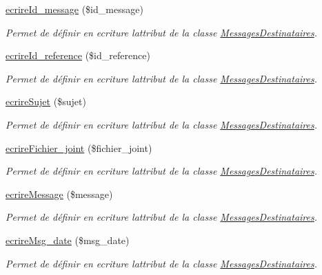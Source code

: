 \begin{DoxyCompactItemize}
\hyperlink{class_messages_destinataires_aea5aed1c8ce67a439ae35c2bfa62e6d0}{ecrire\+Id\+\_\+message} (\$id\+\_\+message)
\begin{DoxyCompactList}\small\item\em Permet de définir en ecriture l\textquotesingle{}attribut de la classe \hyperlink{class_messages_destinataires}{Messages\+Destinataires}. \end{DoxyCompactList}\item 
\hyperlink{class_messages_destinataires_a558514a13d24d12529fb44cb69570ebd}{ecrire\+Id\+\_\+reference} (\$id\+\_\+reference)
\begin{DoxyCompactList}\small\item\em Permet de définir en ecriture l\textquotesingle{}attribut de la classe \hyperlink{class_messages_destinataires}{Messages\+Destinataires}. \end{DoxyCompactList}\item 
\hyperlink{class_messages_destinataires_afc9baab378711b5c2f2ee1a55b65b2bb}{ecrire\+Sujet} (\$sujet)
\begin{DoxyCompactList}\small\item\em Permet de définir en ecriture l\textquotesingle{}attribut de la classe \hyperlink{class_messages_destinataires}{Messages\+Destinataires}. \end{DoxyCompactList}\item 
\hyperlink{class_messages_destinataires_a1631d4919b99b1ee745a0327efa30d56}{ecrire\+Fichier\+\_\+joint} (\$fichier\+\_\+joint)
\begin{DoxyCompactList}\small\item\em Permet de définir en ecriture l\textquotesingle{}attribut de la classe \hyperlink{class_messages_destinataires}{Messages\+Destinataires}. \end{DoxyCompactList}\item 
\hyperlink{class_messages_destinataires_a65fa214bdfd7209f433c932e649aedb6}{ecrire\+Message} (\$message)
\begin{DoxyCompactList}\small\item\em Permet de définir en ecriture l\textquotesingle{}attribut de la classe \hyperlink{class_messages_destinataires}{Messages\+Destinataires}. \end{DoxyCompactList}\item 
\hyperlink{class_messages_destinataires_a26431fda4297533eda6902c1f2f417f8}{ecrire\+Msg\+\_\+date} (\$msg\+\_\+date)
\begin{DoxyCompactList}\small\item\em Permet de définir en ecriture l\textquotesingle{}attribut de la classe \hyperlink{class_messages_destinataires}{Messages\+Destinataires}. \end{DoxyCompactList}\item 

\end{DoxyCompactItemize}
